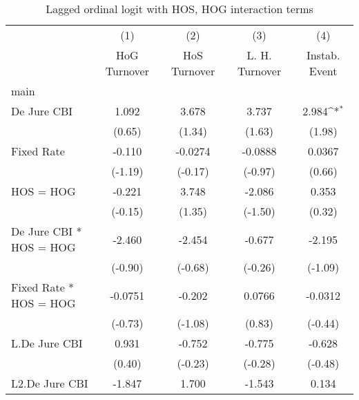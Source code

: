 {
\def\sym#1{\ifmmode^{#1}\else\(^{#1}\)\fi}
\begin{longtable}{l*{4}{c}}
\caption{Lagged ordinal logit with HOS, HOG interaction terms \label{hoshogintlagordLogLogDJ}}\\
\hline\hline\endfirsthead\hline\endhead\hline\endfoot\endlastfoot
                &\multicolumn{1}{c}{(1)}&\multicolumn{1}{c}{(2)}&\multicolumn{1}{c}{(3)}&\multicolumn{1}{c}{(4)}\\
                &\multicolumn{1}{c}{HoG Turnover}&\multicolumn{1}{c}{HoS Turnover}&\multicolumn{1}{c}{L. H. Turnover}&\multicolumn{1}{c}{Instab. Event}\\
\hline
main            &                  &                  &                  &                  \\
De Jure CBI     &    1.092         &    3.678         &    3.737         &    2.984\sym{*}  \\
                &   (0.65)         &   (1.34)         &   (1.63)         &   (1.98)         \\
[1em]
Fixed Rate      &   -0.110         &  -0.0274         &  -0.0888         &   0.0367         \\
                &  (-1.19)         &  (-0.17)         &  (-0.97)         &   (0.66)         \\
[1em]
HOS = HOG       &   -0.221         &    3.748         &   -2.086         &    0.353         \\
                &  (-0.15)         &   (1.35)         &  (-1.50)         &   (0.32)         \\
[1em]
De Jure CBI * HOS = HOG&   -2.460         &   -2.454         &   -0.677         &   -2.195         \\
                &  (-0.90)         &  (-0.68)         &  (-0.26)         &  (-1.09)         \\
[1em]
Fixed Rate * HOS = HOG&  -0.0751         &   -0.202         &   0.0766         &  -0.0312         \\
                &  (-0.73)         &  (-1.08)         &   (0.83)         &  (-0.44)         \\
[1em]
L.De Jure CBI   &    0.931         &   -0.752         &   -0.775         &   -0.628         \\
                &   (0.40)         &  (-0.23)         &  (-0.28)         &  (-0.48)         \\
[1em]
L2.De Jure CBI  &   -1.847         &    1.700         &   -1.543         &    0.134         \\

\end{longtable}}

